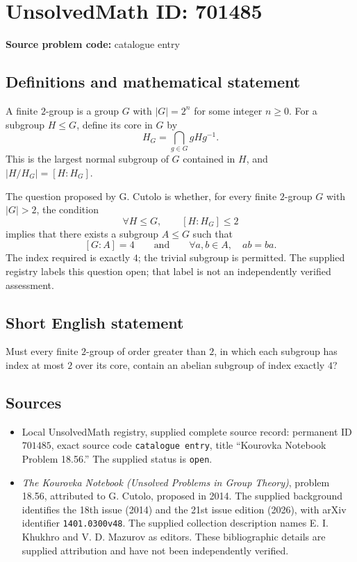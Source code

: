 \documentclass[11pt]{article}
\begin{document}
\section*{UnsolvedMath ID: 701485}
\textbf{Source problem code:} catalogue entry
\subsection{Definitions and mathematical statement}
A finite \(2\)-group is a group \(G\) with \(|G|=2^n\) for some integer \(n\geq 0\). For a subgroup \(H\leq G\), define its core in \(G\) by
\[
H_G=\bigcap_{g\in G}gHg^{-1}.
\]
This is the largest normal subgroup of \(G\) contained in \(H\), and \(|H/H_G|=[H:H_G]\).

The question proposed by G. Cutolo is whether, for every finite \(2\)-group \(G\) with \(|G|>2\), the condition
\[
\forall H\leq G,\qquad [H:H_G]\leq 2
\]
implies that there exists a subgroup \(A\leq G\) such that
\[
[G:A]=4
\qquad\text{and}\qquad
\forall a,b\in A,\quad ab=ba.
\]
The index required is exactly \(4\); the trivial subgroup is permitted. The supplied registry labels this question open; that label is not an independently verified assessment.
\subsection{Short English statement}
Must every finite \(2\)-group of order greater than \(2\), in which each subgroup has index at most \(2\) over its core, contain an abelian subgroup of index exactly \(4\)?
\subsection{Sources}
\begin{itemize}
\item Local UnsolvedMath registry, supplied complete source record: permanent ID \(701485\), exact source code \texttt{catalogue entry}, title ``Kourovka Notebook Problem 18.56.'' The supplied status is \texttt{open}.
\item \emph{The Kourovka Notebook (Unsolved Problems in Group Theory)}, problem 18.56, attributed to G. Cutolo, proposed in 2014. The supplied background identifies the 18th issue (2014) and the 21st issue edition (2026), with arXiv identifier \texttt{1401.0300v48}. The supplied collection description names E. I. Khukhro and V. D. Mazurov as editors. These bibliographic details are supplied attribution and have not been independently verified.
\end{itemize}
\end{document}
